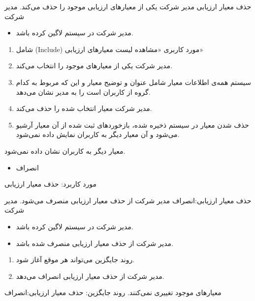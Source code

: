 \usecase
{
حذف معیار ارزیابی
}
{}
{
	مدیر شرکت یکی از معیارهای ارزیابی موجود را حذف می‌کند.
}
{
	مدیر شرکت
}
{}
{
	\begin{itemize}
		\vspace*{-0.6cm}
		\item 
		مدیر شرکت در سیستم لاگین کرده باشد.
	\end{itemize}
}
{
	\begin{enumerate}
	\item 
	شامل (Include) مورد کاربری «مشاهده لیست معیارهای ارزیابی»
	\item
	مدیر شرکت یکی از معیارهای موجود را انتخاب می‌کند.
	\item 
	سیستم همه‌ی اطلاعات معیار شامل عنوان و توضیح معیار و این که مربوط به کدام گروه از کاربران است را به مدیر نشان می‌دهد.
	\item 
 مدیر شرکت معیار انتخاب شده را حذف می‌کند.
	\item 
حذف شدن معیار در سیستم ذخیره شده، بازخوردهای ثبت شده از آن معیار آرشیو می‌شود و آن معیار دیگر به کاربران نمایش داده نمی‌شود.
\end{enumerate}
}
{
معیار دیگر به کاربران نشان داده نمی‌شود.
}
{
	\begin{itemize}
		\vspace*{-0.6cm}
		\item 
		انصراف
	\end{itemize}
}
{
	مورد کاربرد: حذف معیار ارزیابی
}



\alternativeflow
{
	حذف معیار ارزیابی:انصراف
}
{}
{
	مدیر شرکت از حذف معیار ارزیابی منصرف می‌شود.
}
{
	مدیر شرکت
}
{}
{
	\begin{itemize}
		\vspace*{-0.6cm}
		\item 
		مدیر شرکت در سیستم لاگین کرده باشد.
		\item
		مدیر شرکت از حذف معیار ارزیابی منصرف شده باشد.
	\end{itemize}
}
{
	\vspace*{-0.6cm}
	\begin{enumerate}
		\item 
		روند جایگزین می‌تواند هر موقع آغاز شود.
		\item
		مدیر شرکت از حذف معیار ارزیابی انصراف می‌دهد.
	\end{enumerate}
}
{
	معیارهای موجود تغییری نمی‌کنند.
}
{
	روند جایگزین: حذف معیار ارزیابی:انصراف
}
